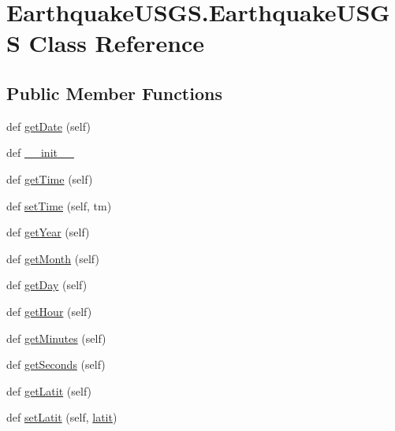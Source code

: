 \hypertarget{class_earthquake_u_s_g_s_1_1_earthquake_u_s_g_s}{}\section{Earthquake\+U\+S\+G\+S.\+Earthquake\+U\+S\+G\+S Class Reference}
\label{class_earthquake_u_s_g_s_1_1_earthquake_u_s_g_s}
\subsection*{Public Member Functions}
\begin{DoxyCompactItemize}
\item 
def \hyperlink{class_earthquake_u_s_g_s_1_1_earthquake_u_s_g_s_a9d4837cf374408c1dea7af8faba509f5}{get\+Date} (self)
\item 
def \hyperlink{class_earthquake_u_s_g_s_1_1_earthquake_u_s_g_s_afbfb7d79fb8873923f7f808f24f05cf4}{\+\_\+\+\_\+init\+\_\+\+\_\+}
\item 
def \hyperlink{class_earthquake_u_s_g_s_1_1_earthquake_u_s_g_s_a9ae4ad7e8b2da01287389ca0b2501c49}{get\+Time} (self)
\item 
def \hyperlink{class_earthquake_u_s_g_s_1_1_earthquake_u_s_g_s_af07aac7ca49d3d0c6a827977a57b686b}{set\+Time} (self, tm)
\item 
def \hyperlink{class_earthquake_u_s_g_s_1_1_earthquake_u_s_g_s_abaeb5aa269fc898effe87ec9924e97c5}{get\+Year} (self)
\item 
def \hyperlink{class_earthquake_u_s_g_s_1_1_earthquake_u_s_g_s_a7405c1e6bbbe7774ce9c11c6719d77cb}{get\+Month} (self)
\item 
def \hyperlink{class_earthquake_u_s_g_s_1_1_earthquake_u_s_g_s_a852a0b583bc355277761f1e5ee85dc6a}{get\+Day} (self)
\item 
def \hyperlink{class_earthquake_u_s_g_s_1_1_earthquake_u_s_g_s_ad38db7b1a922f888c23c02b7a64be7e2}{get\+Hour} (self)
\item 
def \hyperlink{class_earthquake_u_s_g_s_1_1_earthquake_u_s_g_s_a271246dee3eeb6096fc8b318e80878ee}{get\+Minutes} (self)
\item 
def \hyperlink{class_earthquake_u_s_g_s_1_1_earthquake_u_s_g_s_a7acf38ebb14eaf196a0617ba4403b4f6}{get\+Seconds} (self)
\item 
def \hyperlink{class_earthquake_u_s_g_s_1_1_earthquake_u_s_g_s_a4c47d4a79f996cf5c371b4417fec74b6}{get\+Latit} (self)
\item 
def \hyperlink{class_earthquake_u_s_g_s_1_1_earthquake_u_s_g_s_a55dcf35305d85d574cba541b26280368}{set\+Latit} (self, \hyperlink{class_earthquake_u_s_g_s_1_1_earthquake_u_s_g_s_ae115284d341b74a7e28e34e178216718}{latit})

\end{DoxyCompactItemize}
